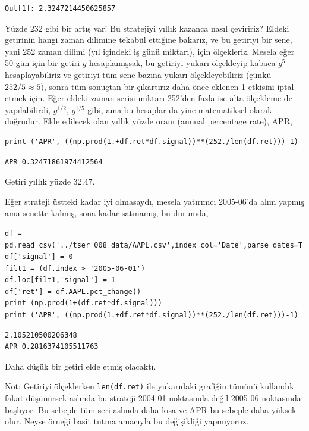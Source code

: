 \documentclass[12pt,fleqn]{article}\usepackage{../../common}
\begin{document}
\begin{verbatim}
Out[1]: 2.3247214450625857
\end{verbatim}

Yüzde 232 gibi bir artış var! Bu stratejiyi yıllık kazanca nasıl çeviririz?
Eldeki getirinin hangi zaman dilimine tekabül ettiğine bakarız, ve bu getiriyi
bir sene, yani 252 zaman dilimi (yıl içindeki iş günü miktarı), için
ölçekleriz. Mesela eğer 50 gün için bir getiri $g$ hesaplamışsak, bu getiriyi
yukarı ölçekleyip kabaca $g^5$ hesaplayabiliriz ve getiriyi tüm sene bazına
yukarı ölçekleyebiliriz (çünkü $252/5 \approx 5$), sonra tüm sonuçtan bir
çıkartırız daha önce eklenen 1 etkisini iptal etmek için. Eğer eldeki zaman
serisi miktarı 252'den fazla ise alta ölçekleme de yapılabilirdi, $g^{1/2}$,
$g^{1/5}$ gibi, ama bu hesaplar da yine matematiksel olarak doğrudur. Elde
edilecek olan yıllık yüzde oranı (annual percentage rate), APR,

\begin{verbatim}
print ('APR', ((np.prod(1.+df.ret*df.signal))**(252./len(df.ret)))-1)
\end{verbatim}

\begin{verbatim}
APR 0.32471861974412564
\end{verbatim}

Getiri yıllık yüzde 32.47.

Eğer strateji üstteki kadar iyi olmasaydı, mesela yatırımcı 2005-06'da
alım yapmış ama senette kalmış, sona kadar satmamış, bu durumda,

\begin{verbatim}
df = pd.read_csv('../tser_008_data/AAPL.csv',index_col='Date',parse_dates=True)
df['signal'] = 0
filt1 = (df.index > '2005-06-01')
df.loc[filt1,'signal'] = 1
df['ret'] = df.AAPL.pct_change()
print (np.prod(1+(df.ret*df.signal)))
print ('APR', ((np.prod(1.+df.ret*df.signal))**(252./len(df.ret)))-1)
\end{verbatim}

\begin{verbatim}
2.105210500206348
APR 0.2816374105511763
\end{verbatim}

Daha düşük bir getiri elde etmiş olacaktı.

Not: Getiriyi ölçeklerken \verb!len(df.ret)! ile yukarıdaki grafiğin tümünü
kullandık fakat düşünürsek aslında bu strateji 2004-01 noktasında değil 2005-06
noktasında başlıyor. Bu sebeple tüm seri aslında daha kısa ve APR bu sebeple
daha yüksek olur. Neyse örneği basit tutma amacıyla bu değişikliği yapmıyoruz.
\end{document}

